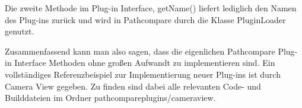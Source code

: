 Die zweite Methode im Plug-in Interface, getName() liefert lediglich den Namen
des Plug-ins zurück und wird in Pathcompare durch die Klasse PluginLoader
genutzt.

Zusammenfassend kann man also sagen, dass die eigenlichen Pathcompare Plug-in Interface
Methoden ohne großen Aufwandt zu implementieren sind. Ein vollständiges
Referenzbeispiel zur Implementierung neuer Plug-ins ist durch Camera View gegeben.
Zu finden sind dabei alle relevanten Code- und Builddateien im Ordner
pathcompareplugins/cameraview.

